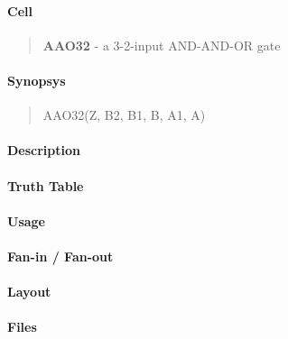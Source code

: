 \label{AAO32}
\paragraph{Cell}
\begin{quote}
    \textbf{AAO32} - a 3-2-input AND-AND-OR gate
\end{quote}

\paragraph{Synopsys}
\begin{quote}
    AAO32(Z, B2, B1, B, A1, A)
\end{quote}

\paragraph{Description}

%

\paragraph{Truth Table}
%

\paragraph{Usage}

\paragraph{Fan-in / Fan-out}

\paragraph{Layout}

\paragraph{Files}
